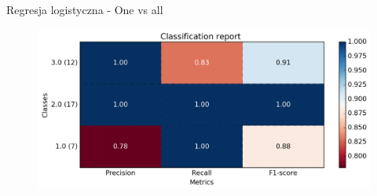 \documentclass[xcolor=x11names,compress]{beamer}
\renewcommand{\(}{\begin{columns}}
\renewcommand{\)}{\end{columns}}
\newcommand{\<}[1]{\begin{column}{#1}}
\renewcommand{\>}{\end{column}}
\begin{document}
\begin{frame}{Regresja logistyczna - One vs all}
        \begin{figure}\includegraphics[width=1\textwidth]{one_vs_all.png} \end{figure}

\end{frame}
\end{document}
